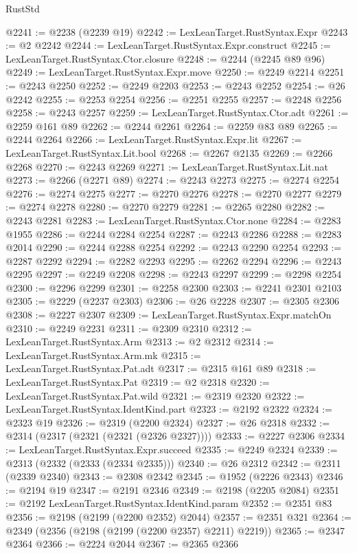 \begin{lexlean}{RustStd}
\begin{coremodule}
@2241 := @2238 (@2239 @19)
@2242 := LexLeanTarget.RustSyntax.Expr
@2243 := @2 @2242
@2244 := LexLeanTarget.RustSyntax.Expr.construct
@2245 := LexLeanTarget.RustSyntax.Ctor.closure
@2248 := @2244 (@2245 @89 @96)
@2249 := LexLeanTarget.RustSyntax.Expr.move
@2250 := @2249 @2214
@2251 := @2243 @2250
@2252 := @2249 @2203
@2253 := @2243 @2252
@2254 := @26 @2242
@2255 := @2253 @2254
@2256 := @2251 @2255
@2257 := @2248 @2256
@2258 := @2243 @2257
@2259 := LexLeanTarget.RustSyntax.Ctor.adt
@2261 := @2259 @161 @89
@2262 := @2244 @2261
@2264 := @2259 @83 @89
@2265 := @2244 @2264
@2266 := LexLeanTarget.RustSyntax.Expr.lit
@2267 := LexLeanTarget.RustSyntax.Lit.bool
@2268 := @2267 @2135
@2269 := @2266 @2268
@2270 := @2243 @2269
@2271 := LexLeanTarget.RustSyntax.Lit.nat
@2273 := @2266 (@2271 @89)
@2274 := @2243 @2273
@2275 := @2274 @2254
@2276 := @2274 @2275
@2277 := @2270 @2276
@2278 := @2270 @2277
@2279 := @2274 @2278
@2280 := @2270 @2279
@2281 := @2265 @2280
@2282 := @2243 @2281
@2283 := LexLeanTarget.RustSyntax.Ctor.none
@2284 := @2283 @1955
@2286 := @2244 @2284 @2254
@2287 := @2243 @2286
@2288 := @2283 @2014
@2290 := @2244 @2288 @2254
@2292 := @2243 @2290 @2254
@2293 := @2287 @2292
@2294 := @2282 @2293
@2295 := @2262 @2294
@2296 := @2243 @2295
@2297 := @2249 @2208
@2298 := @2243 @2297
@2299 := @2298 @2254
@2300 := @2296 @2299
@2301 := @2258 @2300
@2303 := @2241 @2301 @2103
@2305 := @2229 (@2237 @2303)
@2306 := @26 @2228
@2307 := @2305 @2306
@2308 := @2227 @2307
@2309 := LexLeanTarget.RustSyntax.Expr.matchOn
@2310 := @2249 @2231
@2311 := @2309 @2310
@2312 := LexLeanTarget.RustSyntax.Arm
@2313 := @2 @2312
@2314 := LexLeanTarget.RustSyntax.Arm.mk
@2315 := LexLeanTarget.RustSyntax.Pat.adt
@2317 := @2315 @161 @89
@2318 := LexLeanTarget.RustSyntax.Pat
@2319 := @2 @2318
@2320 := LexLeanTarget.RustSyntax.Pat.wild
@2321 := @2319 @2320
@2322 := LexLeanTarget.RustSyntax.IdentKind.part
@2323 := @2192 @2322
@2324 := @2323 @19
@2326 := @2319 (@2200 @2324)
@2327 := @26 @2318
@2332 := @2314 (@2317 (@2321 (@2321 (@2326 @2327))))
@2333 := @2227 @2306
@2334 := LexLeanTarget.RustSyntax.Expr.succeed
@2335 := @2249 @2324
@2339 := @2313 (@2332 (@2333 (@2334 @2335)))
@2340 := @26 @2312
@2342 := @2311 (@2339 @2340)
@2343 := @2308 @2342
@2345 := @1952 (@2226 @2343)
@2346 := @2194 @19
@2347 := @2191 @2346
@2349 := @2198 (@2205 @2084)
@2351 := @2192 LexLeanTarget.RustSyntax.IdentKind.param
@2352 := @2351 @83
@2356 := @2198 (@2199 (@2200 @2352) @2044)
@2357 := @2351 @321
@2364 := @2349 (@2356 (@2198 (@2199 (@2200 @2357) @2211) @2219))
@2365 := @2347 @2364
@2366 := @2224 @2044
@2367 := @2365 @2366

\end{coremodule}
\end{lexlean}
